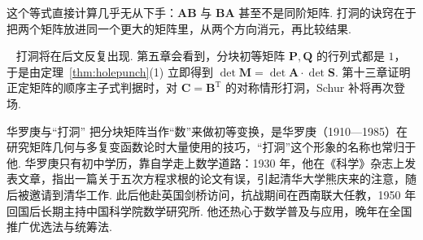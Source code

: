 \documentclass[lang=cn,10.5pt,scheme=chinese,toc=twocol,section,chinesefont=nofont,
twoside,citestyle=gb7714-2015,bibstyle=gb7714-2015]{elegantbook}
\DeclareRobustCommand{\textbf}[1]{{\lnsemiboldlatin\lnsemiboldcjk #1}}
\newcommand{\vv}[1]{\boldsymbol{#1}}
\newcommand{\trans}{\mathrm{T}}             %
\numberwithin{equation}{section}   %
\newcommand*{\lnlabel}[1]{{\sffamily\bfseries\color{black}#1}}
\renewenvironment{remark}{\noindent\lnlabel{\remarkname}\ }{\par}
\begin{document}
这个等式直接计算几乎无从下手：$\vv{AB}$ 与 $\vv{BA}$ 甚至不是同阶矩阵. 打洞的诀窍在于\textbf{把两个矩阵放进同一个更大的矩阵里}，从两个方向消元，再比较结果.

\begin{remark}
  打洞将在后文反复出现. 第五章会看到，分块初等矩阵 $\vv P,\vv Q$ 的行列式都是 $1$，于是由定理~\ref{thm:holepunch}(1) 立即得到 $\det\vv M=\det\vv A\cdot\det\vv S$. 第十三章证明正定矩阵的顺序主子式判据时，对 $\vv C=\vv B^\trans$ 的对称情形打洞，Schur 补将再次登场.
\end{remark}

\begin{historybox}{华罗庚与“打洞”}
  把分块矩阵当作“数”来做初等变换，是华罗庚（1910—1985）在研究矩阵几何与多复变函数论时大量使用的技巧，“打洞”这个形象的名称也常归于他. 华罗庚只有初中学历，靠自学走上数学道路：1930 年，他在《科学》杂志上发表文章，指出一篇关于五次方程求根的论文有误，引起清华大学熊庆来的注意，随后被邀请到清华工作. 此后他赴英国剑桥访问，抗战期间在西南联大任教，1950 年回国后长期主持中国科学院数学研究所. 他还热心于数学普及与应用，晚年在全国推广优选法与统筹法.
\end{historybox}
\end{document}
